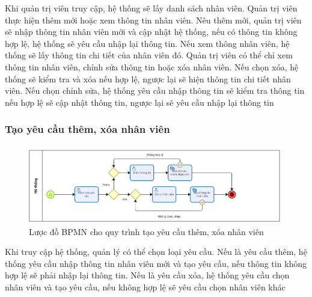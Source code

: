 Khi quản trị viên truy cập, hệ thống sẽ lấy danh sách nhân viên. Quản trị viên thực hiện thêm mới hoặc xem thông tin nhân viên. Nêu thêm mới, quản trị viên sẽ nhập thông tin nhân viên mới và cập nhật hệ thống, nếu có thông tin không hợp lệ, hệ thống sẽ yêu cầu nhập lại thông tin. Nếu xem thông nhân viên, hệ thống sẽ lấy thông tin chi tiết của nhân viên đó. Quản trị viên có thể chỉ xem thông tin nhân viên, chỉnh sửa thông tin hoặc xóa nhân viên. Nếu chọn xóa, hệ thống sẽ kiểm tra và xóa nếu hợp lệ, ngược lại sẽ hiện thông tin chi tiết nhân viên. Nếu chọn chỉnh sửa, hệ thống yêu cầu nhập thông tin sẽ kiểm tra thông tin nếu hợp lệ sẽ cập nhật thông tin, ngược lại sẽ yêu cầu nhập lại thông tin



\subsubsection*{Tạo yêu cầu thêm, xóa nhân viên}
\begin{figure}[!htp]
	\centering
	\includegraphics[width=14cm]{img/BPMN/Hien/Employee_request.png}
	\newline
	\caption{Lược đồ BPMN cho quy trình tạo yêu cầu thêm, xóa nhân viên}
\end{figure}

Khi truy cập hệ thống, quản lý có thể chọn loại yêu cầu. Nếu là yêu cầu thêm, hệ thống yêu cầu nhập thông tin nhân viên mới và tạo yêu cầu, nếu thông tin không hợp lệ sẽ phải nhập lại thông tin. Nếu là yêu cầu xóa, hệ thống yêu cầu chọn nhân viên và tạo yêu cầu, nếu không hợp lệ sẽ yêu cầu chọn nhân viên khác